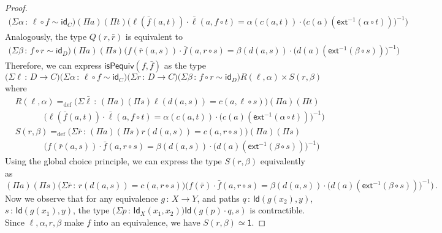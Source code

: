 \documentclass[10pt,a4paper,oneside,reqno]{amsart}
\theoremstyle{mythm}
\theoremstyle{mydef}
\theoremstyle{myrmk}
\newcommand{\defeq}{=_{\mathrm{def}}}
\newcommand{\co}{\,{:}\,}
\newcommand{\com}{\circ}
\newcommand{\idfun}[1]{\mathsf{id}_{#1}}
\newcommand{\ct}{\cdot}
\newcommand{\ext}{\mathsf{ext}}
\newcommand{\one}{\mathsf{1}}
\newcommand{\Id}{\mathsf{Id}}
\begin{document}
\begin{proof}
\begin{align*}
\big(\Sigma \alpha \co \ell \circ f \sim \idfun{C} \big) (\Pi a) (\Pi t) \Big(\ell(\bar{f}(a,t)) \ct \bar{\ell}(a, f \com t) = \alpha(c(a,t)) \ct \big(c(a)(\ext^{-1}(\alpha \circ t))\big)^{-1}\Big)
\end{align*}
Analogously, the type $Q(r,\bar{r})$ is equivalent to
\begin{align*}
\big(\Sigma \beta \co f \com r \sim \idfun{D} \big) (\Pi a) (\Pi s) \Big(f(\bar{r}(a,s)) \ct \bar{f}(a, r \com s) = \beta(d(a,s)) \ct \big(d(a)(\ext^{-1}(\beta \circ s))\big)^{-1}\Big)
\end{align*}
Therefore, we can express $\mathsf{isPequiv}(f,\bar{f})$ as the type
\[ \big(\Sigma \ell \co D\to C) \big(\Sigma \alpha \co \ell \circ f \sim \idfun{C}\big) \big(\Sigma r \co D\to C) \big(\Sigma \beta \co f \circ r \sim \idfun{D}\big) R(\ell,\alpha) \times S(r,\beta)\]
where
\begin{align*}
& R(\ell,\alpha) \defeq \big(\Sigma \bar{\ell} \co (\Pi a) (\Pi s) \ell(d(a,s))=c(a,\ell \circ s)\big) (\Pi a) (\Pi t) \\ & \;\;\;\;\;\;\;\;\;\;\;\; \Big(\ell(\bar{f}(a,t)) \ct \bar{\ell}(a, f \com t) = \alpha(c(a,t)) \ct \big(c(a)(\ext^{-1}(\alpha \circ t))\big)^{-1}\Big) \\
& S(r,\beta) \defeq \big(\Sigma \bar{r} \co (\Pi a) (\Pi s) r(d(a,s))=c(a,r \circ s) \big) (\Pi a) (\Pi s) \\ & \;\;\;\;\;\;\;\;\;\;\;\; \Big(f(\bar{r}(a,s)) \ct \bar{f}(a, r \com s) = \beta(d(a,s)) \ct \big(d(a)(\ext^{-1}(\beta \circ s))\big)^{-1}\Big)
\end{align*}
Using the global choice principle, we can express the type $S(r,\beta)$ equivalently as
\[  (\Pi a) (\Pi s) \big(\Sigma \bar{r} \co r(d(a,s))=c(a,r \circ s) \big) \Big(f(\bar{r}) \ct \bar{f}(a, r \com s) = \beta(d(a,s)) \ct \big(d(a)(\ext^{-1}(\beta \circ s))\big)^{-1}\Big) \, .
\]
Now we observe that for any equivalence $g \co X \to Y$, and paths $q \co \Id(g(x_2),y)$, $s \co \Id(g(x_1),y)$, the type $\big(\Sigma p \co \Id_X(x_1,x_2)\big) \Id(g(p) \ct q,s)$ is contractible. Since $\ell, \alpha, r, \beta$ make $f$ into an equivalence, we have $S(r,\beta) \simeq \one$.


\end{proof}
\end{document}
